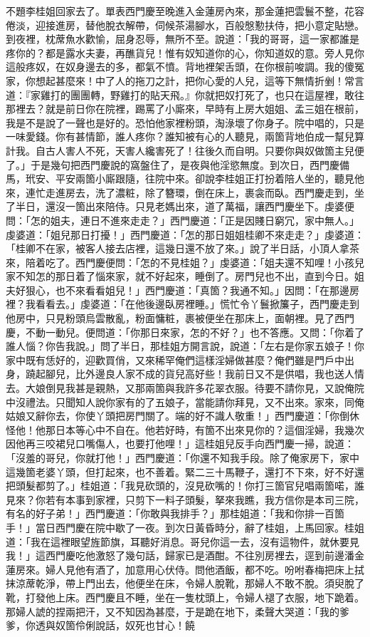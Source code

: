 不題李桂姐回家去了。單表西門慶至晚進入金蓮房內來，那金蓮把雲鬟不整，花容倦淡，迎接進房，替他脫衣解帶，伺候茶湯腳水，百般慇懃扶侍，把小意定貼戀。到夜裡，枕蓆魚水歡愉，屈身忍辱，無所不至。說道：「我的哥哥，這一家都誰是疼你的？都是露水夫妻，再醮貨兒！惟有奴知道你的心，你知道奴的意。旁人見你這般疼奴，在奴身邊去的多，都氣不憤。背地裡架舌頭，在你根前唆調。我的傻冤家，你想起甚麼來！中了人的拖刀之計，把你心愛的人兒，這等下無情折剉！常言道：『家雞打的團團轉，野雞打的貼天飛。』你就把奴打死了，也只在這屋裡，敢往那裡去？就是前日你在院裡，踢罵了小廝來，早時有上房大姐姐、孟三姐在根前，我是不是說了一聲也是好的。恐怕他家裡粉頭，淘淥壞了你身子。院中唱的，只是一味愛錢。你有甚情節，誰人疼你？誰知被有心的人聽見，兩箇背地伯成一幫兒算計我。自古人害人不死，天害人纔害死了！往後久而自明。只要你與奴做箇主兒便了。」于是幾句把西門慶說的窩盤住了，是夜與他淫慾無度。到次日，西門慶備馬，玳安、平安兩箇小廝跟隨，往院中來。卻說李桂姐正打扮着陪人坐的，聽見他來，連忙走進房去，洗了濃粧，除了簪環，倒在床上，裹衾而臥。西門慶走到，坐了半日，還沒一箇出來陪侍。只見老媽出來，道了萬福，讓西門慶坐下。虔婆便問：「怎的姐夫，連日不進來走走？」西門慶道：「正是因賤日窮冗，家中無人。」虔婆道：「姐兒那日打擾！」西門慶道：「怎的那日姐姐桂卿不來走走？」虔婆道：「桂卿不在家，被客人接去店裡，這幾日還不放了來。」說了半日話，小頂人拿茶來，陪着吃了。西門慶便問：「怎的不見桂姐？」虔婆道：「姐夫還不知哩！小孩兒家不知怎的那日着了惱來家，就不好起來，睡倒了。房門兒也不出，直到今日。姐夫好狠心，也不來看看姐兒！」西門慶道：「真箇？我通不知。」因問：「在那邊房裡？我看看去。」虔婆道：「在他後邊臥房裡睡。」慌忙令丫鬟掀簾子，西門慶走到他房中，只見粉頭烏雲散亂，粉面慵粧，裹被便坐在那床上，面朝裡。見了西門慶，不動一動兒。便問道：「你那日來家，怎的不好？」也不答應。又問：「你着了誰人惱？你告我說。」問了半日，那桂姐方開言說，說道：「左右是你家五娘子！你家中既有恁好的，迎歡買俏，又來稀罕俺們這樣淫婦做甚麼？俺們雖是門戶中出身，蹺起腳兒，比外邊良人家不成的貨兒高好些！我前日又不是供唱，我也送人情去。大娘倒見我甚是親熱，又那兩箇與我許多花翠衣服。待要不請你見，又說俺院中沒禮法。只聞知人說你家有的了五娘子，當能請你拜見，又不出來。家來，同俺姑娘又辭你去，你使丫頭把房門關了。端的好不識人敬重！」西門慶道：「你倒休怪他！他那日本等心中不自在。他若好時，有箇不出來見你的？這個淫婦，我幾次因他再三咬裙兒口嘴傷人，也要打他哩！」這桂姐兒反手向西門慶一掃，說道：「沒羞的哥兒，你就打他！」西門慶道：「你還不知我手段。除了俺家房下，家中這幾箇老婆丫頭，但打起來，也不善着。緊二三十馬鞭子，還打不下來，好不好還把頭髮都剪了。」桂姐道：「我見砍頭的，沒見砍嘴的！你打三箇官兒唱兩箇喏，誰見來？你若有本事到家裡，只剪下一料子頭髮，拏來我瞧，我方信你是本司三院，有名的好子弟！」西門慶道：「你敢與我排手？」那桂姐道：「我和你排一百箇手！」當日西門慶在院中歇了一夜。到次日黃昏時分，辭了桂姐，上馬回家。桂姐道：「我在這裡眼望旌節旗，耳聽好消息。哥兒你這一去，沒有這物件，就休要見我！」這西門慶吃他激怒了幾句話，歸家已是酒酣。不往別房裡去，逕到前邊潘金蓮房來。婦人見他有酒了，加意用心伏侍。問他酒飯，都不吃。吩咐春梅把床上拭抹涼蓆乾淨，帶上門出去，他便坐在床，令婦人脫靴，那婦人不敢不脫。須臾脫了靴，打發他上床。西門慶且不睡，坐在一隻枕頭上，令婦人褪了衣服，地下跪着。那婦人諕的捏兩把汗，又不知因為甚麼，于是跪在地下，柔聲大哭道：「我的爹爹，你透與奴箇伶俐說話，奴死也甘心！饒